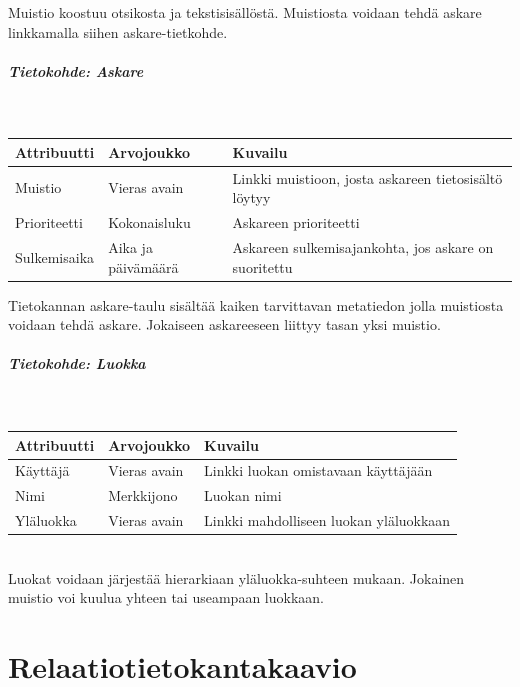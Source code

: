 ﻿\documentclass[finnish]{report}
\begin{document}
\vspace{5pt}
Muistio koostuu otsikosta ja tekstisisällöstä. Muistiosta voidaan tehdä askare linkkamalla siihen askare-tietkohde.


\paragraph{Tietokohde: Askare} ~\\

\begin{tabular}{ | l | l | l | }
  \hline
  Attribuutti & Arvojoukko & Kuvailu \\ \hline
  Muistio & Vieras avain & Linkki muistioon, josta askareen tietosisältö löytyy \\
  Prioriteetti & Kokonaisluku & Askareen prioriteetti \\
  Sulkemisaika & Aika ja päivämäärä & Askareen sulkemisajankohta, jos askare on suoritettu \\
  \hline
\end{tabular}

\vspace{5pt}
Tietokannan askare-taulu sisältää kaiken tarvittavan metatiedon jolla muistiosta voidaan tehdä askare.
Jokaiseen askareeseen liittyy tasan yksi muistio.


\paragraph{Tietokohde: Luokka} ~\\

\begin{tabular}{ | l | l | l | }
  \hline
  Attribuutti & Arvojoukko & Kuvailu \\ \hline
  Käyttäjä & Vieras avain & Linkki luokan omistavaan käyttäjään \\
  Nimi & Merkkijono & Luokan nimi \\
  Yläluokka & Vieras avain & Linkki mahdolliseen luokan yläluokkaan \\
  \hline
\end{tabular} \\

\vspace{5pt}
Luokat voidaan järjestää hierarkiaan yläluokka-suhteen mukaan. Jokainen muistio voi kuulua yhteen tai useampaan luokkaan.


\chapter{Relaatiotietokantakaavio}
\end{document}
